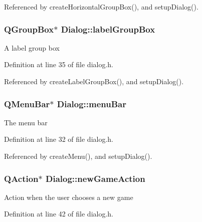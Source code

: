 Referenced by create\-Horizontal\-Group\-Box(), and setup\-Dialog().

\hypertarget{class_dialog_a93ffff453dba285f896156d073d58220}{
\subsubsection[{label\-Group\-Box}]{\setlength{\rightskip}{0pt plus 5cm}Q\-Group\-Box$\ast$ Dialog\-::label\-Group\-Box\hspace{0.3cm}{\ttfamily [private]}}}\label{class_dialog_a93ffff453dba285f896156d073d58220}
A label group box 

Definition at line 35 of file dialog.\-h.



Referenced by create\-Label\-Group\-Box(), and setup\-Dialog().

\hypertarget{class_dialog_a9712b5e90ad0a47d97d27bb2648e753b}{
\subsubsection[{menu\-Bar}]{\setlength{\rightskip}{0pt plus 5cm}Q\-Menu\-Bar$\ast$ Dialog\-::menu\-Bar\hspace{0.3cm}{\ttfamily [private]}}}\label{class_dialog_a9712b5e90ad0a47d97d27bb2648e753b}
The menu bar 

Definition at line 32 of file dialog.\-h.



Referenced by create\-Menu(), and setup\-Dialog().

\hypertarget{class_dialog_a8b086eb4a5d1ec32a4ddfc3abe705505}{
\subsubsection[{new\-Game\-Action}]{\setlength{\rightskip}{0pt plus 5cm}Q\-Action$\ast$ Dialog\-::new\-Game\-Action\hspace{0.3cm}{\ttfamily [private]}}}\label{class_dialog_a8b086eb4a5d1ec32a4ddfc3abe705505}
Action when the user chooses a new game 

Definition at line 42 of file dialog.\-h.



